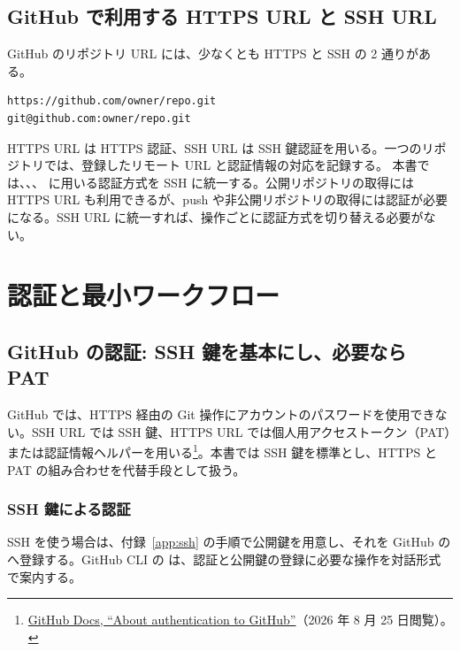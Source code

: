 \subsection{GitHub で利用する HTTPS URL と SSH URL}

GitHub のリポジトリ URL には、少なくとも HTTPS と SSH の 2 通りがある。

\begin{lstlisting}[numbers=none, xleftmargin=2\zw]
https://github.com/owner/repo.git
git@github.com:owner/repo.git
\end{lstlisting}

HTTPS URL は HTTPS 認証、SSH URL は SSH 鍵認証を用いる。一つのリポジトリでは、登録したリモート URL と認証情報の対応を記録する。
本書では、、、 に用いる認証方式を SSH に統一する。公開リポジトリの取得には HTTPS URL も利用できるが、push や非公開リポジトリの取得には認証が必要になる。SSH URL に統一すれば、操作ごとに認証方式を切り替える必要がない。

\section{認証と最小ワークフロー}

\subsection{GitHub の認証: SSH 鍵を基本にし、必要なら PAT}

GitHub では、HTTPS 経由の Git 操作にアカウントのパスワードを使用できない。SSH URL では SSH 鍵、HTTPS URL では個人用アクセストークン（PAT）または認証情報ヘルパーを用いる\footnote{\href{https://docs.github.com/en/authentication/keeping-your-account-and-data-secure/about-authentication-to-github}{GitHub Docs, ``About authentication to GitHub''}（2026 年 8 月 25 日閲覧）。}。本書では SSH 鍵を標準とし、HTTPS と PAT の組み合わせを代替手段として扱う。

\subsubsection{SSH 鍵による認証}

SSH を使う場合は、付録~\ref{app:ssh} の手順で公開鍵を用意し、それを GitHub の  へ登録する。GitHub CLI の  は、認証と公開鍵の登録に必要な操作を対話形式で案内する。

